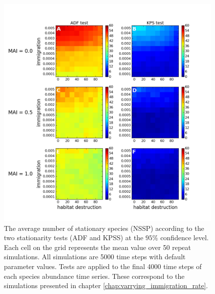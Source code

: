 \begin{figure}[hp]
	\centering
	\includegraphics[width=1.0\linewidth]{"./chapters/chapter04b/figures/nssp_ir_v_hl"}
    \caption{The average number of stationary species (NSSP) according to the two stationarity tests (ADF and KPSS) at the $95\%$ confidence level. Each cell on the grid represents the mean value over 50 repeat simulations. All simulations are 5000 time steps with default parameter values. Tests are applied to the final 4000 time steps of each species abundance time series. These correspond to the simulations presented in chapter \ref{chap:varrying_immigration_rate}.}
    \label{fig:nssp_ir_v_hl}
\end{figure}



